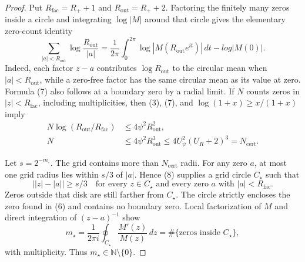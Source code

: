\documentclass{article}
\begin{document}
\begin{proof}
Put \(R_{\mathrm{fac}}=R_++1\) and \(R_{\mathrm{out}}=R_++2\).  Factoring the finitely many zeros inside a circle and integrating \(\log|M|\) around that circle gives the elementary zero-count identity
\[
 \sum_{|a|<R_{\mathrm{out}}}\log\frac{R_{\mathrm{out}}}{|a|}
 =\frac1{2\pi}\int_0^{2\pi}\log|M(R_{\mathrm{out}}e^{it})|\,dt-log|M(0)|. \tag{7}
\]
Indeed, each factor \(z-a\) contributes \(\log R_{\mathrm{out}}\) to the circular mean when \(|a|<R_{\mathrm{out}}\), while a zero-free factor has the same circular mean as its value at zero.  Formula (7) also follows at a boundary zero by a radial limit.  If \(N\) counts zeros in \(|z|<R_{\mathrm{fac}}\), including multiplicities, then (3), (7), and \(\log(1+x)\ge x/(1+x)\) imply
\[
 \begin{aligned}
 N\log(R_{\mathrm{out}}/R_{\mathrm{fac}})
 &\le4\psi^2R_{\mathrm{out}}^2,\\
 N&\le4\psi^2R_{\mathrm{out}}^3
 \le4U_\psi^2(U_R+2)^3=N_{\mathrm{cert}}. 
 \end{aligned} \tag{8}
\]

Let \(s=2^{-m_\circ}\).  The grid contains more than \(N_{\mathrm{cert}}\) radii.  For any zero \(a\), at most one grid radius lies within \(s/3\) of \(|a|\).  Hence (8) supplies a grid circle \(C_\star\) such that
\[
 \bigl||z|-|a|\bigr|\ge s/3
 \quad\text{for every }z\in C_\star
 \text{ and every zero }a\text{ with }|a|<R_{\mathrm{fac}}. \tag{9}
\]
Zeros outside that disk are still farther from \(C_\star\).  The circle strictly encloses the zero found in (6) and contains no boundary zero.  Local factorization of \(M\) and direct integration of \((z-a)^{-1}\) show
\[
 m_\star=\frac1{2\pi i}\oint_{C_\star}\frac{M'(z)}{M(z)}\,dz
 =\#\{\text{zeros inside }C_\star\}, \tag{10}
\]
with multiplicity.  Thus \(m_\star\in\mathbb N\setminus\{0\}\).


\end{proof}
\end{document}
